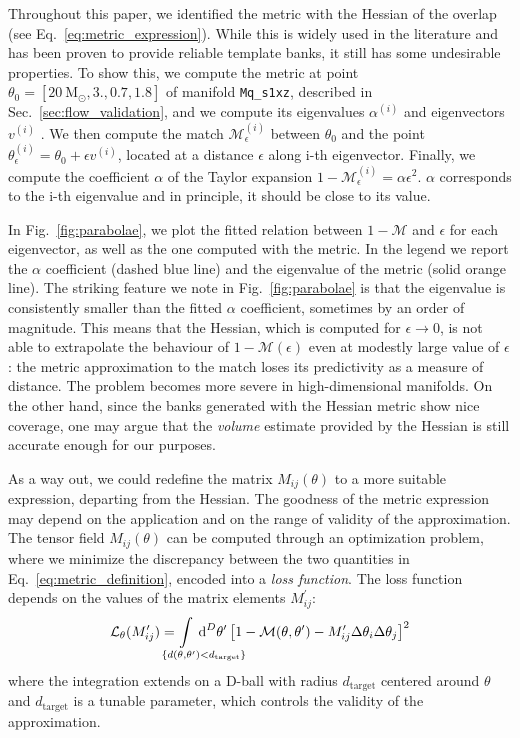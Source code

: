 \documentclass[twocolumn,showpacs,preprintnumbers,nofootinbib,prd,
superscriptaddress,10pt]{revtex4-2}
\newcommand{\dvol}[2]{\ensuremath{\operatorname{d}^{#2}\!{#1}}}
\begin{document}
Throughout this paper, we identified the metric with the Hessian of the overlap (see Eq.~\eqref{eq:metric_expression}). While this is widely used in the literature \cite{owen_metric, Messenger:2008ta} and has been proven to provide reliable template banks, it still has some undesirable properties.
To show this, we compute the metric at point $\theta_0 = [\SI{20}{\mathrm{M_\odot}}, 3., 0.7, 1.8]$ of manifold \texttt{Mq\_s1xz}, described in Sec.~\ref{sec:flow_validation}, and we compute its eigenvalues $\alpha^{(i)}$ and eigenvectors $v^{(i)}$ . We then compute the match $\mathcal{M}^{(i)}_\epsilon$ between $\theta_0$ and the point $\theta^{(i)}_\epsilon = \theta_0 + \epsilon v^{(i)}$, located at a distance $\epsilon$ along i-th eigenvector.
Finally, we  compute the coefficient $\alpha$ of the Taylor expansion $1 - \mathcal{M}^{(i)}_\epsilon = \alpha  \epsilon^2$.
$\alpha$ corresponds to the i-th eigenvalue and in principle, it should be close to its value.

In Fig.~\ref{fig:parabolae}, we plot the fitted relation between $1 - \mathcal{M}$ and $\epsilon$ for each eigenvector, as well as the one computed with the metric. In the legend we report the $\alpha$ coefficient (dashed blue line) and the eigenvalue of the metric (solid orange line).
The striking feature we note in Fig.~\ref{fig:parabolae} is that the eigenvalue is consistently smaller than the fitted $\alpha$ coefficient, sometimes by an order of magnitude.
This means that the Hessian, which is computed for $\epsilon\rightarrow 0$, is not able to extrapolate the behaviour of $1 - \mathcal{M}(\epsilon)$ even at modestly large value of $\epsilon$: the metric approximation to the match loses its predictivity as a measure of distance.
The problem becomes more severe in high-dimensional manifolds.
On the other hand, since the banks generated with the Hessian metric show nice coverage, one may argue that the {\it volume} estimate provided by the Hessian is still accurate enough for our purposes.

As a way out, we could redefine the matrix $M_{ij}(\theta)$ to a more suitable expression, departing from the Hessian.
The goodness of the metric expression may depend on the application and on the range of validity of the approximation.
The tensor field $M_{ij}(\theta)$ can be computed through an optimization problem, where we minimize the discrepancy between the two quantities in Eq.~\eqref{eq:metric_definition}, encoded into a {\it loss function}.
The loss function depends on the values of the matrix elements $M^\prime_{ij}$:
\begin{equation} \label{eq:loss_function}
	\mathcal{L}_\theta(M^\prime_{ij}) = \hspace{-4em} \int\limits_{\hspace{3em}\{d(\theta,\theta^\prime) < d_\mathrm{target}\}} \hspace{-3.8em}
		\dvol{\theta^\prime}{D}  \left[ 1 - \mathcal{M}(\theta,\theta^\prime) - M^\prime_{ij} \Delta\theta_i \Delta\theta_j \right]^2
\end{equation}
where the integration extends on a D-ball with radius $d_\mathrm{target}$ centered around $\theta$ and $d_\mathrm{target}$ is a tunable parameter, which controls the validity of the approximation.
\end{document}
